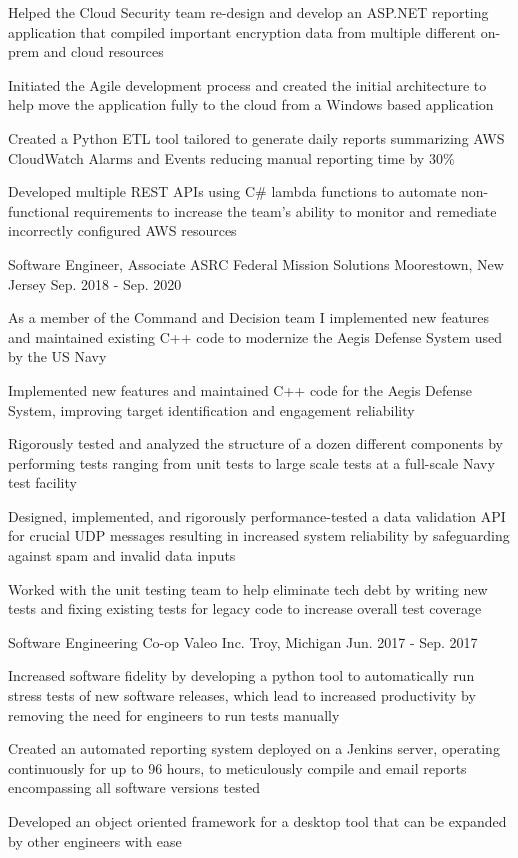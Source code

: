 \begin{cventries}
{\begin{cvitems}
        \item {Helped the Cloud Security team re-design and develop an ASP.NET reporting application that compiled important encryption data from multiple different on-prem and cloud resources}
        \item {Initiated the Agile development process and created the initial architecture to help move the application fully to the cloud from a Windows based application}
        \item {Created a Python ETL tool tailored to generate daily reports summarizing AWS CloudWatch Alarms and Events reducing manual reporting time by 30\%}
        \item {Developed multiple REST APIs using C\# lambda functions to automate non-functional requirements to increase the team's ability to monitor and remediate incorrectly configured AWS resources}
      \end{cvitems} 
    }  
  \cventry
    {Software Engineer, Associate}
    {ASRC Federal Mission Solutions}
    {Moorestown, New Jersey}
    {Sep. 2018 - Sep. 2020}
    {
      \begin{cvitems}
        \item {As a member of the Command and Decision team I implemented new features and maintained existing C++ code to modernize the Aegis Defense System used by the US Navy}
        \item {Implemented new features and maintained C++ code for the Aegis Defense System, improving target identification and engagement reliability}
        \item {Rigorously tested and analyzed the structure of a dozen different components by performing tests ranging from unit tests to large scale tests at a full-scale Navy test facility}
        \item {Designed, implemented, and rigorously performance-tested a data validation API for crucial UDP messages resulting in increased system reliability by safeguarding against spam and invalid data inputs}
        \item {Worked with the unit testing team to help eliminate tech debt by writing new tests and fixing existing tests for legacy code to increase overall test coverage}
      \end{cvitems} 
    }  
  \cventry
    {Software Engineering Co-op}
    {Valeo Inc.}
    {Troy, Michigan}
    {Jun. 2017 - Sep. 2017}
    {
      \begin{cvitems}
        \item {Increased software fidelity by developing a python tool to automatically run stress tests of new software releases, which lead to increased productivity by removing the need for engineers to run tests manually}
        \item {Created an automated reporting system deployed on a Jenkins server, operating continuously for up to 96 hours, to meticulously compile and email reports encompassing all software versions tested}
        \item {Developed an object oriented framework for a desktop tool that can be expanded by other engineers with ease}
      \end{cvitems}
    }
\end{cventries}

